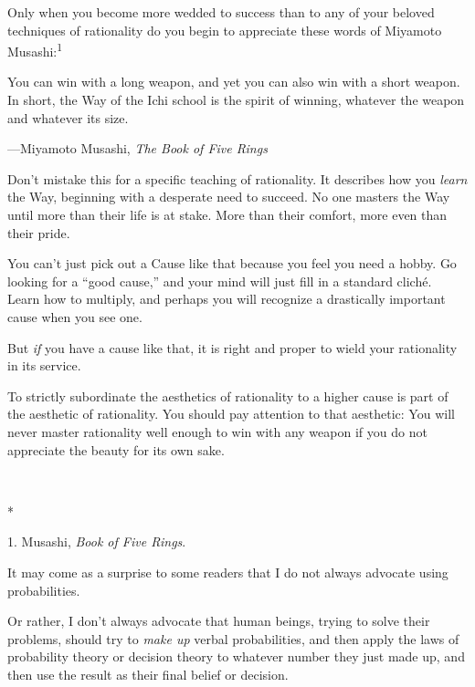 {
 Only when you become more wedded to success than to any of your
beloved techniques of rationality do you begin to appreciate these
words of Miyamoto Musashi:\textsuperscript{1}}

{
 You can win with a long weapon, and yet you can also win with a
short weapon. In short, the Way of the Ichi school is the spirit of
winning, whatever the weapon and whatever its size.}

{\raggedleft
 {}---Miyamoto Musashi, \textit{The Book of Five Rings}
\par}


\bigskip

{
 Don't mistake this for a specific teaching of
rationality. It describes how you \textit{learn} the Way, beginning
with a desperate need to succeed. No one masters the Way until more
than their life is at stake. More than their comfort, more even than
their pride.}

{
 You can't just pick out a Cause like that because
you feel you need a hobby. Go looking for a ``good
cause,'' and your mind will just fill in a standard
cliché. Learn how to multiply, and perhaps you will recognize a
drastically important cause when you see one.}

{
 But \textit{if} you have a cause like that, it is right and proper
to wield your rationality in its service.}

{
 To strictly subordinate the aesthetics of rationality to a higher
cause is part of the aesthetic of rationality. You should pay attention
to that aesthetic: You will never master rationality well enough to win
with any weapon if you do not appreciate the beauty for its own sake.}

{\centering
 \ ~
\par}

{\centering
 *
\par}


\bigskip

{
 1. Musashi, \textit{Book of Five Rings}.}


{
 It may come as a surprise to some readers that I do not always
advocate using probabilities. }

{
 Or rather, I don't always advocate that human
beings, trying to solve their problems, should try to \textit{make up}
verbal probabilities, and then apply the laws of probability theory or
decision theory to whatever number they just made up, and then use the
result as their final belief or decision.}

